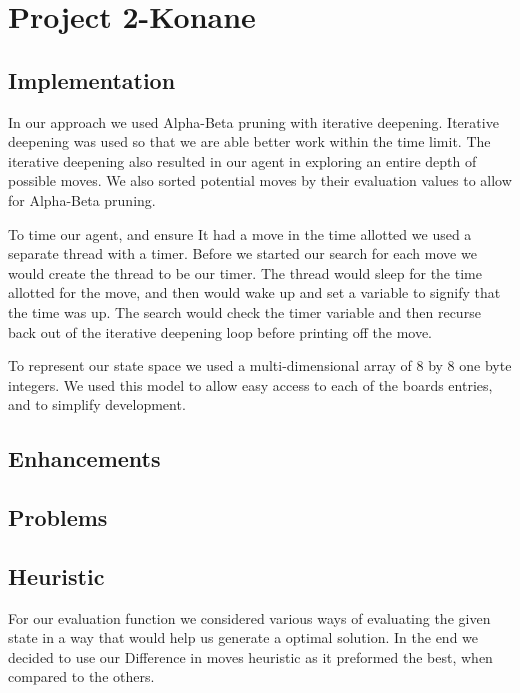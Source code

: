 \documentclass[12pt]{article}
\begin{document}
\section*{Project 2-Konane}

\subsection*{Implementation}
In our approach we used Alpha-Beta pruning with iterative deepening.
Iterative deepening was used so that we are able better work within the time limit.
The iterative deepening also resulted in our agent in exploring an entire depth of possible moves.
We also sorted potential moves by their evaluation values to allow for Alpha-Beta pruning.

To time our agent, and ensure It had a move in the time allotted we used a separate thread with a timer.
Before we started our search for each move we would create the thread to be our timer.
The thread would sleep for the time allotted for the move, and then would wake up and set a variable to signify that the time was up.
The search would check the timer variable and then recurse back out of the iterative deepening loop before printing off the move.

To represent our state space we used a multi-dimensional array of 8 by 8 one byte integers.
We used this model to allow easy access to each of the boards entries, and to simplify development.

\subsection*{Enhancements}


\subsection*{Problems}

\subsection*{Heuristic}
For our evaluation function we considered various ways of evaluating the given state in a way that would help us generate a optimal solution.
In the end we decided to use our Difference in moves heuristic as it preformed the best, when compared to the others.
\end{document}
